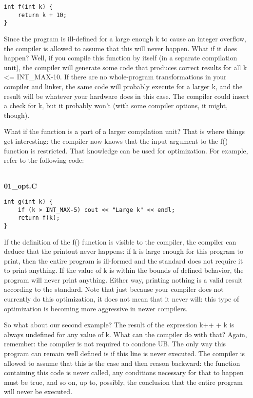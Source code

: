 \begin{lstlisting}[style=styleCXX]
int f(int k) {
	return k + 10;
}
\end{lstlisting}

Since the program is ill-defined for a large enough k to cause an integer overflow, the compiler is allowed to assume that this will never happen. What if it does happen? Well, if you compile this function by itself (in a separate compilation unit), the compiler will generate some code that produces correct results for all k <= INT\_MAX-10. If there are no whole-program transformations in your compiler and linker, the same code will probably execute for a larger k, and the result will be whatever your hardware does in this case. The compiler could insert a check for k, but it probably won't (with some compiler options, it might, though).

What if the function is a part of a larger compilation unit? That is where things get interesting: the compiler now knows that the input argument to the f() function is restricted. That knowledge can be used for optimization. For example, refer to the following code:

\hspace*{\fill} \\ %
\noindent
\textbf{01\_opt.C}
\begin{lstlisting}[style=styleCXX]
int g(int k) {
	if (k > INT_MAX-5) cout << "Large k" << endl;
	return f(k);
}
\end{lstlisting}

If the definition of the f() function is visible to the compiler, the compiler can deduce that the printout never happens: if k is large enough for this program to print, then the entire program is ill-formed and the standard does not require it to print anything. If the value of k is within the bounds of defined behavior, the program will never print anything. Either way, printing nothing is a valid result according to the standard. Note that just because your compiler does not currently do this optimization, it does not mean that it never will: this type of optimization is becoming more aggressive in newer compilers.

So what about our second example? The result of the expression k++ + k is always undefined for any value of k. What can the compiler do with that? Again, remember: the compiler is not required to condone UB. The only way this program can remain well defined is if this line is never executed. The compiler is allowed to assume that this is the case and then reason backward: the function containing this code is never called, any conditions necessary for that to happen must be true, and so on, up to, possibly, the conclusion that the entire program will never be executed.

